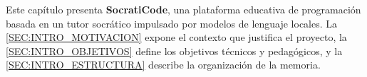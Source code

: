 Este capítulo presenta \textbf{SocratiCode}, una plataforma educativa de programación basada en un tutor socrático impulsado por modelos de lenguaje locales. La \autoref{SEC:INTRO_MOTIVACION} expone el contexto que justifica el proyecto, la \autoref{SEC:INTRO_OBJETIVOS} define los objetivos técnicos y pedagógicos, y la \autoref{SEC:INTRO_ESTRUCTURA} describe la organización de la memoria.
